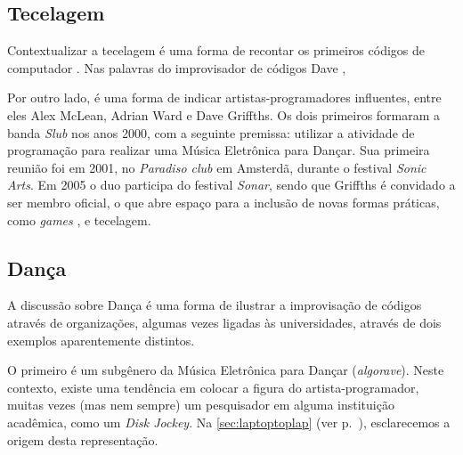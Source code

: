 \subsection*{Tecelagem}

Contextualizar a tecelagem é uma forma de recontar os primeiros códigos de computador . Nas palavras do improvisador de códigos Dave ,


Por outro lado, é uma forma de indicar artistas-programadores influentes, entre eles Alex McLean, Adrian Ward e Dave Griffths. Os dois primeiros formaram a banda \emph{Slub} nos anos 2000, com a seguinte premissa: utilizar a atividade de programação para realizar uma Música Eletrônica para Dançar. Sua primeira reunião foi em 2001, no \emph{Paradiso club} em Amsterdã, durante o festival \emph{Sonic Arts}. Em 2005 o duo participa do festival \emph{Sonar}, sendo que Griffths é convidado a ser membro oficial, o que abre espaço para a inclusão de novas formas práticas, como \emph{games} \cite[p.~138--140]{McLean2011}, e tecelagem.

\subsection*{Dança}

A discussão sobre Dança é uma forma de ilustrar a improvisação de códigos através de organizações, algumas vezes ligadas às universidades, através de dois exemplos aparentemente distintos.

O primeiro é um subgênero da Música Eletrônica para Dançar (\emph{algorave}). Neste contexto, existe uma tendência em colocar a figura do artista-programador, muitas vezes (mas nem sempre) um pesquisador em alguma instituição acadêmica, como um \emph{Disk Jockey}. Na \autoref{sec:laptoptoplap} (ver p.~\pageref{sec:laptoptoplap}), esclarecemos a origem desta representação.

